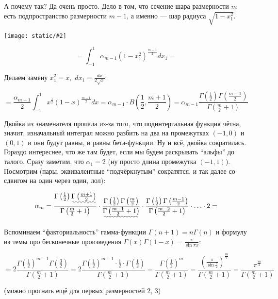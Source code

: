 \documentclass{article}
\def\dbl{\,\,}
\def\images#1#2{\begin{center}\texttt{[image: static/\#2]}\end{center}}
\begin{document}
А почему так? Да очень просто. Дело в том, что сечение шара размерности $m$ есть подпространство размерности $m - 1$, а именно --- шар радиуса $\sqrt{1 - x_1^2}$.

\images{0.5}{objom.jpg}

\[= \int_{-1}^{1} \alpha_{m - 1} (1 - x_1^2)^{\frac{m - 1}{2}} dx_1 = \]

Делаем замену $x_1^2 = x, \dbl dx_1 = \frac{dx}{2\sqrt{x}}$:

\[= \frac{\alpha_{m - 1}}{2} \int_{-1}^{1} x^{\frac{1}{2}}(1 - x)^{\frac{m - 1}{2}}dx = \alpha_{m - 1} \cdot B\left(\frac{1}{2}, \frac{m + 1}{2}\right) = \alpha_{m - 1}\frac{\Gamma\left(\frac{1}{2}\right)\Gamma\left(\frac{m + 1}{2}\right)}{\Gamma\left(\frac{m}{2} + 1\right)}\]

Двойка из знаменателя пропала из-за того, что подинтергальная функция чётна, значит, изначальный интеграл можно разбить на два на промежутках $(-1, 0)$ и $(0, 1)$ и они будут равны, и равны бета-функции. Ну и всё, двойка сократилась. Гораздо интереснее, что же там будет, если мы будем раскрывать ``альфы'' до талого. Сразу заметим, что $\alpha_1 = 2$ (ну просто длина промежутка $(-1, 1)$). Посмотрим (пары, эквивалентные ``подчёркнутым'' сократятся, и так далее со сдвигом на один через один, лол):

\[\alpha_{m} = \frac{\Gamma\left(\frac{1}{2}\right)\uwave{\Gamma\left(\frac{m + 1}{2}\right)}}{\Gamma\left(\frac{m}{2} + 1\right)} \cdot \frac{\Gamma\left(\frac{1}{2}\right)\Gamma\left(\frac{m}{2}\right)}{\uwave{\Gamma\left(\frac{m - 1}{2} + 1\right)}} \cdot \frac{\Gamma\left(\frac{1}{2}\right)\Gamma\left(\frac{m - 1}{2}\right)}{\Gamma\left(\frac{m - 2}{2} + 1\right)} \cdot \ldots \cdot 2 = \]

Вспоминаем ``факториальность'' гамма-функции $\Gamma(n + 1) = n\Gamma(n)$ и формулу из темы про бесконечные произведения $\Gamma(x)\Gamma(1 - x) = \frac{\pi}{\sin \pi x}$:

\[= 2\frac{\Gamma\left(\frac{1}{2}\right)^{m - 1}\Gamma\left(\frac{3}{2}\right)}{\Gamma\left(\frac{m}{2} + 1\right)} = 2\frac{\Gamma\left(\frac{1}{2}\right)^{m - 1}\cdot \frac{1}{2} \cdot\Gamma\left(\frac{1}{2}\right)}{\Gamma\left(\frac{m}{2} + 1\right)} = \frac{\Gamma\left(\frac{1}{2}\right)^{m}}{\Gamma\left(\frac{m}{2} + 1\right)} = \frac{\left(\frac{\pi}{\sin \frac{\pi}{2}}\right)^{\frac{m}{2}}}{\Gamma\left(\frac{m}{2} + 1\right)} = \frac{\pi^{\frac{m}{2}}}{\Gamma\left(\frac{m}{2} + 1\right)}\]

(можно прогнать ещё для первых размерностей 2, 3)
\end{document}
